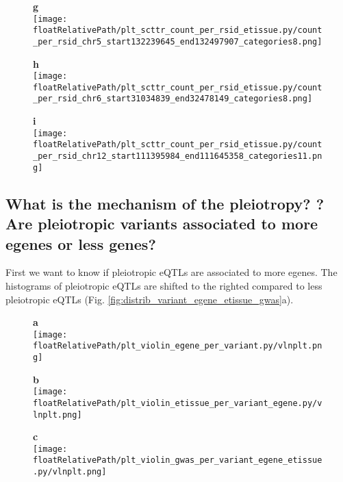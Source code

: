 \begin{figure*}[!ht]
\begin{subfigure}[]{.33\textwidth}
\textbf{g}
\\
\texttt{[image: \\floatRelativePath/plt\_scttr\_count\_per\_rsid\_etissue.py/count\_per\_rsid\_chr5\_start132239645\_end132497907\_categories8.png]}
\end{subfigure}
%
\begin{subfigure}[]{.33\textwidth}
\textbf{h}
\\
\texttt{[image: \\floatRelativePath/plt\_scttr\_count\_per\_rsid\_etissue.py/count\_per\_rsid\_chr6\_start31034839\_end32478149\_categories8.png]}
\end{subfigure}
%
\begin{subfigure}[]{.33\textwidth}
\textbf{i}
\\
\texttt{[image: \\floatRelativePath/plt\_scttr\_count\_per\_rsid\_etissue.py/count\_per\_rsid\_chr12\_start111395984\_end111645358\_categories11.png]}
\end{subfigure}

\caption{\textbf{Count of GWAS categories, eGenes and eTissues in pleiotropic genomic regions.} (\textbf{a,d,g}) Region 5:132,239,645-132,497,907, \textbf{b,e,h}) region 6:31,034,839-32,478,149,  and \textbf{c,g,i}) region 12:111,395,984-111,645,358} \label{fig:region_gwas_egenes_tissues}
%
\end{figure*}

\subsection*{What is the mechanism of the pleiotropy? ? Are pleiotropic variants associated to more egenes or less genes?}

First we want to know if pleiotropic eQTLs are associated to more egenes.
The histograms of pleiotropic eQTLs are shifted to the righted compared to less pleiotropic eQTLs (Fig. \ref{fig:distrib_variant_egene_etissue_gwas}a).


\begin{figure*}[!]
\centering
%
\begin{subfigure}[]{.33\textwidth}
\textbf{a}
\\
\texttt{[image: \\floatRelativePath/plt\_violin\_egene\_per\_variant.py/vlnplt.png]}
\end{subfigure}
%
\begin{subfigure}[]{.33\textwidth}
\textbf{b}
\\
\texttt{[image: \\floatRelativePath/plt\_violin\_etissue\_per\_variant\_egene.py/vlnplt.png]}
\end{subfigure}
%
\begin{subfigure}[]{.33\textwidth}
\textbf{c}
\\
\texttt{[image: \\floatRelativePath/plt\_violin\_gwas\_per\_variant\_egene\_etissue.py/vlnplt.png]}
\end{subfigure}
%
\caption{\textbf{TODO.} (\textbf{a}) TODO.} \label{fig:distrib_variant_egene_etissue_gwas}
%
\end{figure*}

